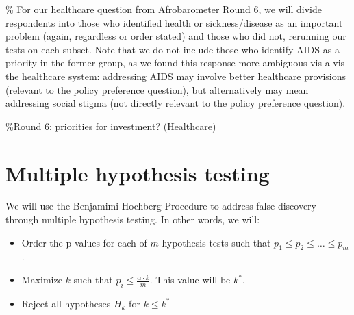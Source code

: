 \documentclass[]{article}
\begin{document}
\% For our healthcare question from Afrobarometer Round 6, we will
divide respondents into those who identified health or sickness/disease
as an important problem (again, regardless or order stated) and those
who did not, rerunning our tests on each subset. Note that we do not
include those who identify AIDS as a priority in the former group, as we
found this response more ambiguous vis-a-vis the healthcare system:
addressing AIDS may involve better healthcare provisions (relevant to
the policy preference question), but alternatively may mean addressing
social stigma (not directly relevant to the policy preference question).

\%Round 6: priorities for investment? (Healthcare)

\section{Multiple hypothesis testing}\label{multiple-hypothesis-testing}

We will use the Benjamimi-Hochberg Procedure to address false discovery
through multiple hypothesis testing. In other words, we will:

\begin{itemize}
  \item Order the p-values for each of $m$ hypothesis tests such that $p_1 \leq p_2 \leq \ldots \leq p_m$.
  \item Maximize $k$ such that $p_i \leq \frac{\alpha \cdot k}{m}$. This value will be $k^*$.
  \item Reject all hypotheses $H_k$ for $k \leq k^*$
\end{itemize}
\end{document}
